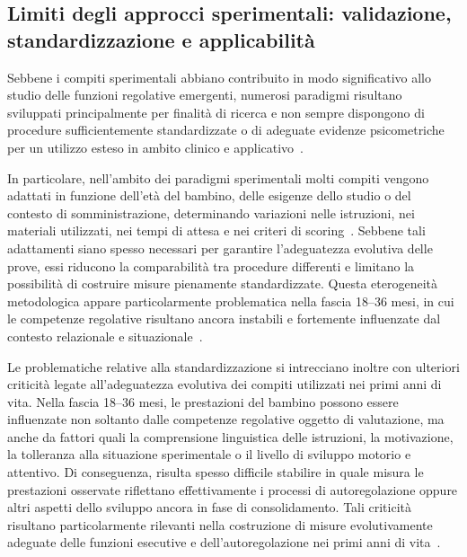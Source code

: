         \subsection{Limiti degli approcci sperimentali: validazione, standardizzazione e applicabilità}
        \label{sec:3_4_4}

            Sebbene i compiti sperimentali abbiano contribuito in modo significativo allo studio delle funzioni regolative emergenti, numerosi paradigmi risultano sviluppati principalmente per finalità di ricerca e non sempre dispongono di procedure sufficientemente standardizzate o di adeguate evidenze psicometriche per un utilizzo esteso in ambito clinico e applicativo~\cite{hughes2002,mcclelland2012}.

            In particolare, nell'ambito dei paradigmi sperimentali molti compiti vengono adattati in funzione dell'età del bambino, delle esigenze dello studio o del contesto di somministrazione, determinando variazioni nelle istruzioni, nei materiali utilizzati, nei tempi di attesa e nei criteri di scoring~\cite{hughes2002,carlson2005}. Sebbene tali adattamenti siano spesso necessari per garantire l'adeguatezza evolutiva delle prove, essi riducono la comparabilità tra procedure differenti e limitano la possibilità di costruire misure pienamente standardizzate. Questa eterogeneità metodologica appare particolarmente problematica nella fascia 18--36 mesi, in cui le competenze regolative risultano ancora instabili e fortemente influenzate dal contesto relazionale e situazionale~\cite{mcclelland2012}.

            Le problematiche relative alla standardizzazione si intrecciano inoltre con ulteriori criticità legate all'adeguatezza evolutiva dei compiti utilizzati nei primi anni di vita. Nella fascia 18--36 mesi, le prestazioni del bambino possono essere influenzate non soltanto dalle competenze regolative oggetto di valutazione, ma anche da fattori quali la comprensione linguistica delle istruzioni, la motivazione, la tolleranza alla situazione sperimentale o il livello di sviluppo motorio e attentivo. Di conseguenza, risulta spesso difficile stabilire in quale misura le prestazioni osservate riflettano effettivamente i processi di autoregolazione oppure altri aspetti dello sviluppo ancora in fase di consolidamento. Tali criticità risultano particolarmente rilevanti nella costruzione di misure evolutivamente adeguate delle funzioni esecutive e dell'autoregolazione nei primi anni di vita~\cite{carlson2005}.

